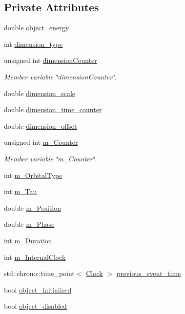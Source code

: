 \subsection*{Private Attributes}
\begin{DoxyCompactItemize}
\item 
double \mbox{\hyperlink{classDimension_a4b4e30a89bc08dd201962f530b7c31f8}{object\+\_\+energy}}
\item 
int \mbox{\hyperlink{classDimension_add0a5cbc1ccf67d063dbaf5e1ee07b40}{dimension\+\_\+type}}
\item 
unsigned int \mbox{\hyperlink{classDimension_aafe44c853102feeea49e8ffa00f2c6ae}{dimension\+Counter}}
\begin{DoxyCompactList}\small\item\em Member variable \char`\"{}dimension\+Counter\char`\"{}. \end{DoxyCompactList}\item 
double \mbox{\hyperlink{classDimension_a7ed6787b2ac9e0fe7e8fec36a3a1c287}{dimension\+\_\+scale}}
\item 
double \mbox{\hyperlink{classDimension_a3e2868e1f50df8d249835aa3d4819a52}{dimension\+\_\+time\+\_\+counter}}
\item 
double \mbox{\hyperlink{classDimension_aba67083965a790931bc581a65f6ca01a}{dimension\+\_\+offset}}
\item 
unsigned int \mbox{\hyperlink{classDimension_a286384f40ffbb03d770307bb3a2b57d9}{m\+\_\+\+Counter}}
\begin{DoxyCompactList}\small\item\em Member variable \char`\"{}m\+\_\+\+Counter\char`\"{}. \end{DoxyCompactList}\item 
int \mbox{\hyperlink{classDimension_aa808e7d2df6d70eb81b74b8f5b1107c5}{m\+\_\+\+Orbital\+Type}}
\item 
int \mbox{\hyperlink{classDimension_a7c7a09553bdb908fc0f133e3049c62e3}{m\+\_\+\+Tau}}
\item 
double \mbox{\hyperlink{classDimension_a1e1ba937169eefc74b53fac47ae4cf54}{m\+\_\+\+Position}}
\item 
double \mbox{\hyperlink{classDimension_aad79e5f97dffe0bff2908fee13d9ce8f}{m\+\_\+\+Phase}}
\item 
int \mbox{\hyperlink{classDimension_ad3a31f39b4ce1d8e2c777bffd8042378}{m\+\_\+\+Duration}}
\item 
int \mbox{\hyperlink{classDimension_af3cd48a0e5321d1cf48b24c48fcc5659}{m\+\_\+\+Internal\+Clock}}
\item 
std\+::chrono\+::time\+\_\+point$<$ \mbox{\hyperlink{universe_8h_a0ef8d951d1ca5ab3cfaf7ab4c7a6fd80}{Clock}} $>$ \mbox{\hyperlink{classDimension_addc0ef6daebc40044668f4db8667c9c6}{previous\+\_\+event\+\_\+time}}
\item 
bool \mbox{\hyperlink{classDimension_add91aa075486fb41cb889a1132ce1d9b}{object\+\_\+initialised}}
\item 
bool \mbox{\hyperlink{classDimension_abab9945cfe63c94dcf2a25e2fb3651e1}{object\+\_\+disabled}}
\end{DoxyCompactItemize}
